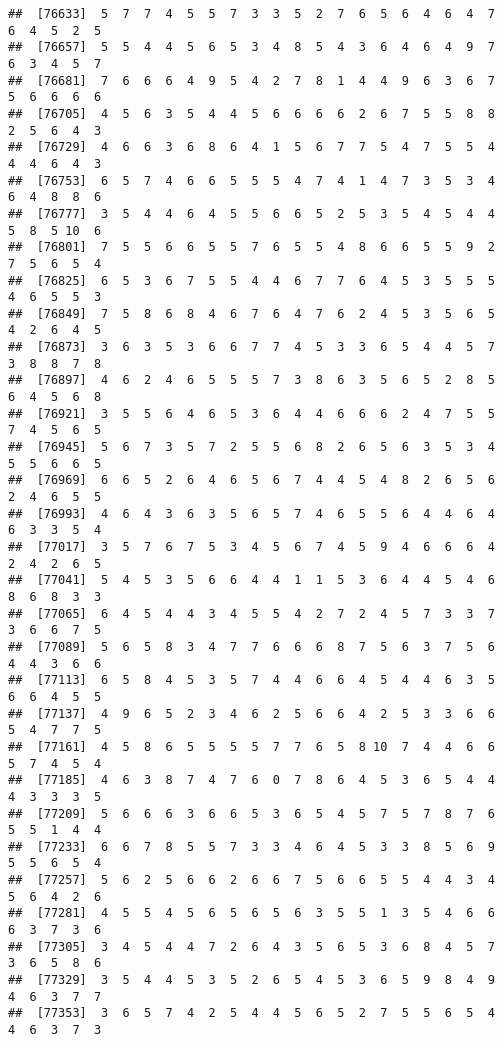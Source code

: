 \documentclass[
]{book}
\begin{document}
\begin{verbatim}
##  [76633]  5  7  7  4  5  5  7  3  3  5  2  7  6  5  6  4  6  4  7  6  4  5  2  5
##  [76657]  5  5  4  4  5  6  5  3  4  8  5  4  3  6  4  6  4  9  7  6  3  4  5  7
##  [76681]  7  6  6  6  4  9  5  4  2  7  8  1  4  4  9  6  3  6  7  5  6  6  6  6
##  [76705]  4  5  6  3  5  4  4  5  6  6  6  6  2  6  7  5  5  8  8  2  5  6  4  3
##  [76729]  4  6  6  3  6  8  6  4  1  5  6  7  7  5  4  7  5  5  4  4  4  6  4  3
##  [76753]  6  5  7  4  6  6  5  5  5  4  7  4  1  4  7  3  5  3  4  6  4  8  8  6
##  [76777]  3  5  4  4  6  4  5  5  6  6  5  2  5  3  5  4  5  4  4  5  8  5 10  6
##  [76801]  7  5  5  6  6  5  5  7  6  5  5  4  8  6  6  5  5  9  2  7  5  6  5  4
##  [76825]  6  5  3  6  7  5  5  4  4  6  7  7  6  4  5  3  5  5  5  4  6  5  5  3
##  [76849]  7  5  8  6  8  4  6  7  6  4  7  6  2  4  5  3  5  6  5  4  2  6  4  5
##  [76873]  3  6  3  5  3  6  6  7  7  4  5  3  3  6  5  4  4  5  7  3  8  8  7  8
##  [76897]  4  6  2  4  6  5  5  5  7  3  8  6  3  5  6  5  2  8  5  6  4  5  6  8
##  [76921]  3  5  5  6  4  6  5  3  6  4  4  6  6  6  2  4  7  5  5  7  4  5  6  5
##  [76945]  5  6  7  3  5  7  2  5  5  6  8  2  6  5  6  3  5  3  4  5  5  6  6  5
##  [76969]  6  6  5  2  6  4  6  5  6  7  4  4  5  4  8  2  6  5  6  2  4  6  5  5
##  [76993]  4  6  4  3  6  3  5  6  5  7  4  6  5  5  6  4  4  6  4  6  3  3  5  4
##  [77017]  3  5  7  6  7  5  3  4  5  6  7  4  5  9  4  6  6  6  4  2  4  2  6  5
##  [77041]  5  4  5  3  5  6  6  4  4  1  1  5  3  6  4  4  5  4  6  8  6  8  3  3
##  [77065]  6  4  5  4  4  3  4  5  5  4  2  7  2  4  5  7  3  3  7  3  6  6  7  5
##  [77089]  5  6  5  8  3  4  7  7  6  6  6  8  7  5  6  3  7  5  6  4  4  3  6  6
##  [77113]  6  5  8  4  5  3  5  7  4  4  6  6  4  5  4  4  6  3  5  6  6  4  5  5
##  [77137]  4  9  6  5  2  3  4  6  2  5  6  6  4  2  5  3  3  6  6  5  4  7  7  5
##  [77161]  4  5  8  6  5  5  5  5  7  7  6  5  8 10  7  4  4  6  6  5  7  4  5  4
##  [77185]  4  6  3  8  7  4  7  6  0  7  8  6  4  5  3  6  5  4  4  4  3  3  3  5
##  [77209]  5  6  6  6  3  6  6  5  3  6  5  4  5  7  5  7  8  7  6  5  5  1  4  4
##  [77233]  6  6  7  8  5  5  7  3  3  4  6  4  5  3  3  8  5  6  9  5  5  6  5  4
##  [77257]  5  6  2  5  6  6  2  6  6  7  5  6  6  5  5  4  4  3  4  5  6  4  2  6
##  [77281]  4  5  5  4  5  6  5  6  5  6  3  5  5  1  3  5  4  6  6  6  3  7  3  6
##  [77305]  3  4  5  4  4  7  2  6  4  3  5  6  5  3  6  8  4  5  7  3  6  5  8  6
##  [77329]  3  5  4  4  5  3  5  2  6  5  4  5  3  6  5  9  8  4  9  4  6  3  7  7
##  [77353]  3  6  5  7  4  2  5  4  4  5  6  5  2  7  5  5  6  5  4  4  6  3  7  3

\end{verbatim}
\end{document}
